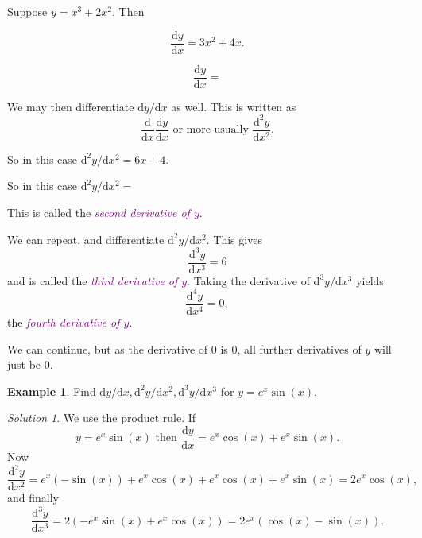 \documentclass[
  english,
  11pt,
  oneside]{book}
\newcommand{\slide}{}
\theoremstyle{definition}
\theoremstyle{definition}
\newtheorem{example}{Example}[chapter]
\theoremstyle{definition}
\theoremstyle{definition}
\theoremstyle{remark}
\newtheorem*{solution}{Solution}
\begin{document}
Suppose \(y = x^3 + 2x^2\). Then

\begin{notslides}

\[\frac{\mathrm{d} y}{\mathrm{d} x} = 3x^2 + 4x.\]

\end{notslides}

\begin{slidesonly}

\[\frac{\mathrm{d} y}{\mathrm{d} x} =\]

\end{slidesonly}

We may then differentiate \(\mathrm{d}y/\mathrm{d} x\) as well. This is written as
\[\frac{\mathrm{d}}{\mathrm{d} x}\frac{\mathrm{d} y}{\mathrm{d} x}\text{ or more usually }\frac{\mathrm{d}^{2}y}{\mathrm{d} x^2}.\]

\begin{notslides}

So in this case \(\mathrm{d}^{2}y/\mathrm{d} x^2 = 6x+4\).

\end{notslides}

\begin{slidesonly}

So in this case \(\mathrm{d}^{2}y/\mathrm{d} x^2 =\)

\end{slidesonly}

This is called the \textcolor{purple}{\em second derivative of $y$}.

\slide

We can repeat, and differentiate \(\mathrm{d}^{2}y/\mathrm{d} x^2\). This gives
\[\frac{\mathrm{d}^{3}y}{\mathrm{d} x^{3}} = 6\]
and is called the \textcolor{purple}{\em third derivative of $y$}. Taking the derivative of \(\mathrm{d}^{3}y/\mathrm{d} x^{3}\) yields
\[\frac{\mathrm{d}^{4}y}{\mathrm{d} x^{4}} = 0,\]
the \textcolor{purple}{\em fourth derivative of $y$}.

We can continue, but as the derivative of \(0\) is \(0\), all further derivatives of \(y\) will just be \(0\).
\slide

\begin{example}
Find \(\mathrm{d}y/\mathrm{d} x, \mathrm{d}^{2}y/\mathrm{d} x^2, \mathrm{d}^{3}y/\mathrm{d} x^{3}\) for \(y =e^x\sin(x)\).
\end{example}

\begin{solution}
We use the product rule. If
\[y=e^x\sin(x)\text{ then }\frac{\mathrm{d} y}{\mathrm{d} x} = e^x\cos(x) + e^x\sin(x).\]
Now
\[\frac{\mathrm{d}^{2}y}{\mathrm{d} x^2} = e^x(-\sin(x)) + e^x\cos(x) + e^x\cos(x)+e^x\sin(x) = 2e^x\cos(x),\]
and finally
\[\frac{\mathrm{d}^{3}y}{\mathrm{d} x^{3}} = 2(-e^x\sin(x)+e^x\cos(x)) = 2e^x(\cos(x)-\sin(x)).\]
\end{solution}
\end{document}
